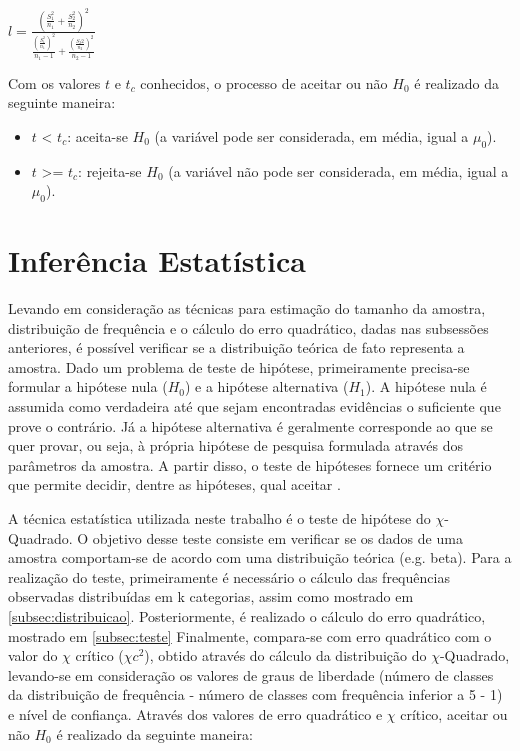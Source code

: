 \documentclass[pt,disc,oneside]{ufscpgeasthesis}
\begin{document}
				\begin{center}
					\LARGE{$l = \frac{ (\frac{S_{1}^{2}}{n_1} + \frac{S_{2}^{2}}{n_2})^2 }{\frac{(\frac{S_{1}^{2}}{n_1})^2}{n_1 - 1} + \frac{(\frac{S_{2}{2}}{n_2})^2}{n_2 - 1}}$}
				\end{center}

				Com os valores $t$ e $t_c$ conhecidos, o processo de aceitar ou não $H_0$ é realizado da seguinte maneira:

				\begin{itemize}
					\item{$t$ < $t_c$:} aceita-se $H_0$ (a variável pode ser considerada, em média, igual a $\mu_0$).
					\item{$t$ >= $t_c$:} rejeita-se $H_0$ (a variável não pode ser considerada, em média, igual a $\mu_0$).
				\end{itemize}

		\section{Inferência Estatística}
		\label{sec:inferencia}

			Levando em consideração as técnicas para estimação do tamanho da amostra, distribuição de frequência e o cálculo do erro quadrático, dadas nas subsessões anteriores, é possível verificar se a distribuição teórica de fato representa a amostra.
			Dado um problema de teste de hipótese, primeiramente precisa-se formular a hipótese nula ($H_0$) e a hipótese alternativa ($H_1$).
			A hipótese nula é assumida como verdadeira até que sejam encontradas evidências o suficiente que prove o contrário.
			Já a hipótese alternativa é geralmente corresponde ao que se quer provar, ou seja, à própria hipótese de pesquisa formulada através dos parâmetros da amostra. 
			A partir disso, o teste de hipóteses fornece um critério que permite decidir, dentre as hipóteses, qual aceitar \cite{Sturges}.
			
			A técnica estatística utilizada neste trabalho é o teste de hipótese do $\chi$-Quadrado.
			O objetivo desse teste consiste em verificar se os dados de uma amostra comportam-se de acordo com uma distribuição teórica (e.g. beta). 
			Para a realização do teste, primeiramente é necessário o cálculo das frequências observadas distribuídas em k categorias, assim como mostrado em \ref{subsec:distribuicao}. 
			Posteriormente, é realizado o cálculo do erro quadrático, mostrado em \ref{subsec:teste}
			Finalmente, compara-se com erro quadrático com o valor do $\chi$ crítico ($\chi c^2$), obtido através do cálculo da distribuição do $\chi$-Quadrado, levando-se em consideração os valores de graus de liberdade (número de classes da distribuição de frequência - número de classes com frequência inferior a 5 - 1) e nível de confiança.
			Através dos valores de erro quadrático e $\chi$ crítico, aceitar ou não $H_0$ é realizado da seguinte maneira:
\end{document}
